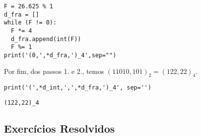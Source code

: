 \begin{ex}
\begin{enumerate}[1.]
\begin{lstlisting}
F = 26.625 % 1
d_fra = []
while (F != 0):
  F *= 4
  d_fra.append(int(F))
  F %= 1
print('(0,',*d_fra,')_4',sep="")
\end{lstlisting}
  \end{enumerate}

  Por fim, dos passos 1. e 2., temos $(11010,101)_2 = (122,22)_4$.

\begin{lstlisting}
print('(',*d_int,',',*d_fra,')_4', sep='')
\end{lstlisting}

\begin{verbatim}
(122,22)_4
\end{verbatim}
\end{ex}

\subsection{Exercícios Resolvidos}

